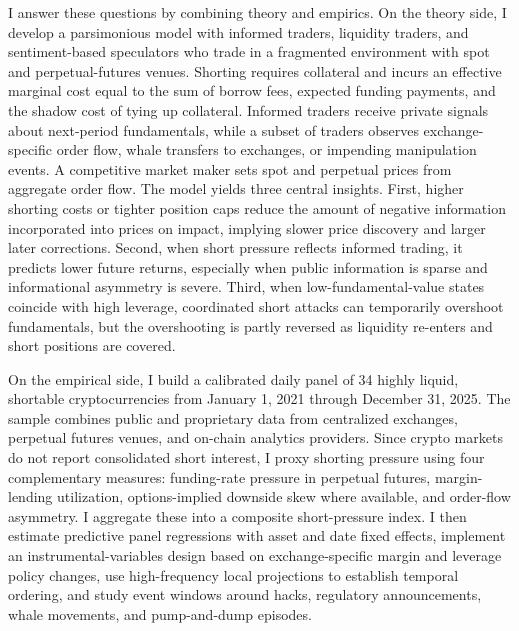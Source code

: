 \documentclass[
]{article}
\begin{document}
I answer these questions by combining theory and empirics. On the theory
side, I develop a parsimonious model with informed traders, liquidity
traders, and sentiment-based speculators who trade in a fragmented
environment with spot and perpetual-futures venues. Shorting requires
collateral and incurs an effective marginal cost equal to the sum of
borrow fees, expected funding payments, and the shadow cost of tying up
collateral. Informed traders receive private signals about next-period
fundamentals, while a subset of traders observes exchange-specific order
flow, whale transfers to exchanges, or impending manipulation events. A
competitive market maker sets spot and perpetual prices from aggregate
order flow. The model yields three central insights. First, higher
shorting costs or tighter position caps reduce the amount of negative
information incorporated into prices on impact, implying slower price
discovery and larger later corrections. Second, when short pressure
reflects informed trading, it predicts lower future returns, especially
when public information is sparse and informational asymmetry is severe.
Third, when low-fundamental-value states coincide with high leverage,
coordinated short attacks can temporarily overshoot fundamentals, but
the overshooting is partly reversed as liquidity re-enters and short
positions are covered.

On the empirical side, I build a calibrated daily panel of 34 highly
liquid, shortable cryptocurrencies from January 1, 2021 through December
31, 2025. The sample combines public and proprietary data from
centralized exchanges, perpetual futures venues, and on-chain analytics
providers. Since crypto markets do not report consolidated short
interest, I proxy shorting pressure using four complementary measures:
funding-rate pressure in perpetual futures, margin-lending utilization,
options-implied downside skew where available, and order-flow asymmetry.
I aggregate these into a composite short-pressure index. I then estimate
predictive panel regressions with asset and date fixed effects,
implement an instrumental-variables design based on exchange-specific
margin and leverage policy changes, use high-frequency local projections
to establish temporal ordering, and study event windows around hacks,
regulatory announcements, whale movements, and pump-and-dump episodes.
\end{document}
